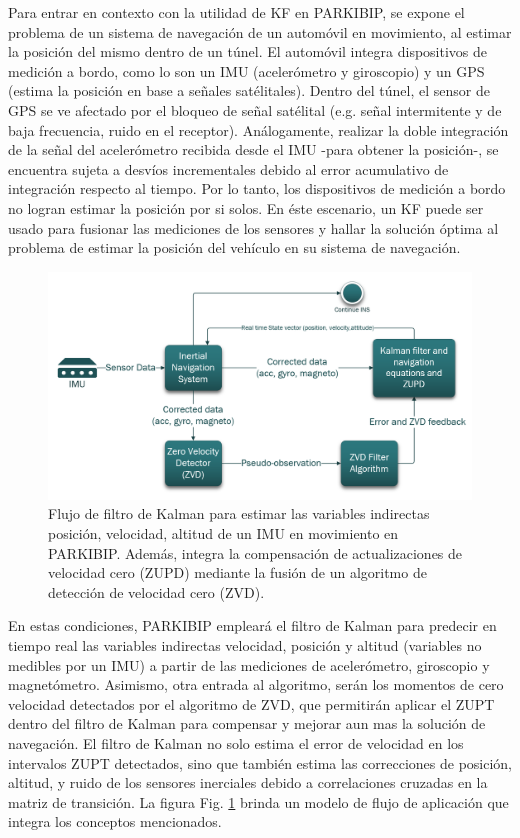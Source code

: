 Para entrar en contexto con la utilidad de KF en PARKIBIP, se expone el problema de un sistema de navegación de un automóvil en movimiento, al estimar la posición del mismo dentro de un túnel. El automóvil integra dispositivos de medición a bordo, como lo son un IMU (acelerómetro y giroscopio) y un GPS (estima la posición en base a señales satélitales).
\noindent Dentro del túnel, el sensor de GPS se ve afectado por el bloqueo de señal satélital (e.g. señal intermitente y de baja frecuencia, ruido en el receptor). Análogamente, realizar la doble integración de la señal del acelerómetro recibida desde el IMU -para obtener la posición-, se encuentra sujeta a desvíos incrementales debido al error acumulativo de integración respecto al tiempo. 
\noindent Por lo tanto, los dispositivos de medición a bordo no logran estimar la posición por si solos. En éste escenario, un KF puede ser usado para fusionar las mediciones de los sensores y hallar la solución óptima al problema de estimar la posición del vehículo en su sistema de navegación.

\begin{figure}[H]
\includegraphics[width=\textwidth]{TESIS/imagenes/chap04/zero-velocity-kalman.PNG}
\caption{ Flujo de filtro de Kalman para estimar las variables indirectas posición, velocidad, altitud de un IMU en movimiento en PARKIBIP. Además, integra la compensación de actualizaciones de velocidad cero (ZUPD) mediante la fusión de un algoritmo de detección de velocidad cero (ZVD).}
\label{fig:zero-velocity-kalman}
\end{figure}

En estas condiciones, PARKIBIP empleará el filtro de Kalman para predecir en tiempo real las variables indirectas velocidad, posición y altitud (variables no medibles por un IMU) a partir de las mediciones de acelerómetro, giroscopio y magnetómetro. Asimismo, otra entrada al algoritmo, serán los momentos de cero velocidad detectados por el algoritmo de ZVD, que permitirán aplicar el ZUPT dentro del filtro de Kalman para compensar y mejorar aun mas la solución de navegación. El filtro de Kalman no solo estima el error de velocidad en los intervalos ZUPT detectados, sino que también estima las correcciones de posición, altitud, y ruido de los sensores inerciales debido a correlaciones cruzadas en la matriz de transición. La figura Fig. \ref{fig:zero-velocity-kalman} brinda un modelo de flujo de aplicación que integra los conceptos mencionados.

